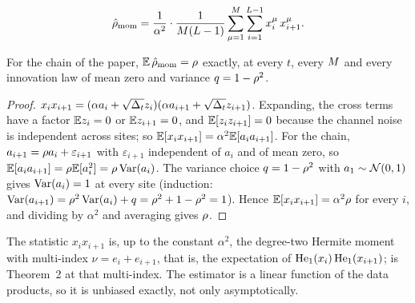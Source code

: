 \begin{definition}
\label{def:rho-mom}
\begin{equation}
  \hat{\rho}_{\mathrm{mom}}=\frac{1}{\alpha^2}\cdot\frac{1}{M(L-1)}\sum_{\mu=1}^{M}\sum_{i=1}^{L-1}x^\mu_i\,x^\mu_{i+1}.
  \label{eq:rho-mom}
\end{equation}
\end{definition}

\begin{proposition}[Unbiasedness]
\label{prop:rho-unbiased}
For the chain of the paper, $\mathbb{E}\,\hat{\rho}_{\mathrm{mom}}=\rho$ exactly, at every $t$,
every $M$ and every innovation law of mean zero and variance $q=1-\rho^2$.
\end{proposition}
\begin{proof}
$x_ix_{i+1}=(\alpha a_i+\sqrt{\Delta_t}z_i)(\alpha a_{i+1}+\sqrt{\Delta_t}z_{i+1})$. Expanding, the
cross terms have a factor $\mathbb{E} z_i=0$ or $\mathbb{E} z_{i+1}=0$, and $\mathbb{E}[z_iz_{i+1}]=0$ because the
channel noise is independent across sites; so $\mathbb{E}[x_ix_{i+1}]=\alpha^2\mathbb{E}[a_ia_{i+1}]$.
For the chain, $a_{i+1}=\rho a_i+\varepsilon_{i+1}$ with $\varepsilon_{i+1}$ independent
of $a_i$ and of mean zero, so $\mathbb{E}[a_ia_{i+1}]=\rho\mathbb{E}[a_i^2]=\rho\operatorname{Var}(a_i)$. The
variance choice $q=1-\rho^2$ with $a_1\sim\mathcal{N}\!\left(0,1\right)$ gives $\operatorname{Var}(a_i)=1$ at every
site (induction: $\operatorname{Var}(a_{i+1})=\rho^2\operatorname{Var}(a_i)+q=\rho^2+1-\rho^2=1$). Hence
$\mathbb{E}[x_ix_{i+1}]=\alpha^2\rho$ for every $i$, and dividing by $\alpha^2$ and averaging
gives $\rho$.
\end{proof}

The statistic $x_ix_{i+1}$ is, up to the constant $\alpha^2$, the degree-two Hermite
moment with multi-index $\nu=e_i+e_{i+1}$, that is, the expectation of
$\mathrm{He}_{1}(x_i)\,\mathrm{He}_{1}(x_{i+1})$;  is Theorem~2 at that
multi-index. The estimator is a linear function of the data products, so it is
unbiased exactly, not only asymptotically.


